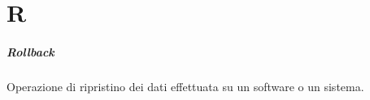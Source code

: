 \chapter{R}

\paragraph*{Rollback}
Operazione di ripristino dei dati effettuata su un software o un sistema.